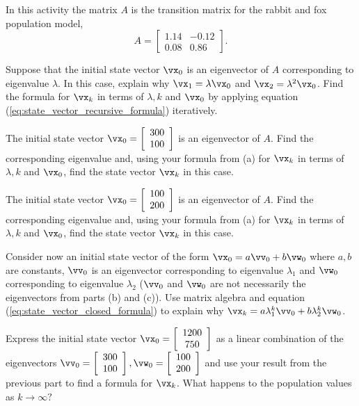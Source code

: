 \begin{activity} \label{act:dynamical_system} In this activity the matrix $A$ is the transition matrix for the rabbit and fox population model,
\[A = \left[ \begin{array}{cr} 1.14 & -0.12 \\ 0.08 & 0.86 \end{array} \right].\]
\ba
\item Suppose that the initial state vector $\vx_0$ is an eigenvector of $A$ corresponding to eigenvalue $\lambda$. In this case, explain why $\vx_1=\lambda \vx_0$ and $\vx_2=\lambda^2 \vx_0$. Find the formula for $\vx_k$ in terms of $\lambda, k$ and $\vx_0$ by applying equation (\ref{eq:state_vector_recursive_formula}) iteratively.



\item The initial state vector $\vx_0=\left[ \begin{array}{c} 300\\100\end{array} \right]$ is an eigenvector of $A$. Find the corresponding eigenvalue and, using your formula from (a) for $\vx_k$ in terms of $\lambda, k$ and $\vx_0$, find the state vector $\vx_k$ in this case.



\item The initial state vector $\vx_0=\left[ \begin{array}{c} 100\\200 \end{array} \right]$ is an eigenvector of $A$. Find the corresponding eigenvalue and, using your formula from (a) for $\vx_k$ in terms of $\lambda, k$ and $\vx_0$, find the state vector $\vx_k$ in this case.



\item Consider now an initial state vector of the form $\vx_0=a\vv_0+b\vw_0$ where $a, b$ are constants, $\vv_0$ is an eigenvector corresponding to eigenvalue $\lambda_1$ and $\vw_0$ corresponding to eigenvalue $\lambda_2$ ($\vv_0$ and $\vw_0$ are not necessarily the eigenvectors from parts (b) and (c)). Use matrix algebra and equation (\ref{eq:state_vector_closed_formula}) to explain why $\vx_k=a\lambda_1^k\vv_0+b\lambda_2^k\vw_0$.



\item Express the initial state vector $\vx_0=\left[ \begin{array}{c} 1200 \\ 750 \end{array} \right]$ as a linear combination of the eigenvectors $\vv_0=\left[ \begin{array}{c}300\\ 100\end{array} \right], \vw_0=\left[ \begin{array}{c} 100\\200\end{array} \right]$ and use your result from the previous part to find a formula for $\vx_k$. What happens to the population values as $k\to \infty?$



\end{activity}
